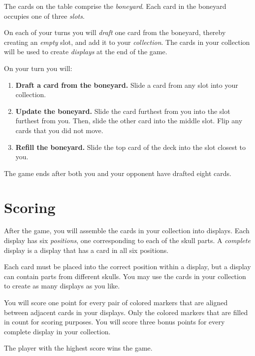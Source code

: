 \documentclass[a6paper, parskip=half, DIV=14, 10pt]{scrartcl}
\begin{document}
The cards on the table comprise the \emph{boneyard}. Each card in the boneyard occupies one of three \emph{slots}.%

On each of your turns you will \emph{draft} one card from the boneyard, thereby creating an \emph{empty} slot, and add it to your \emph{collection}. The cards in your collection will be used to create \emph{displays} at the end of the game.

On your turn you will:
\begin{enumerate}[leftmargin=*]
	\item \textbf{Draft a card from the boneyard.} Slide a card from any slot into your collection.
	\item \textbf{Update the boneyard.} Slide the card furthest from you into the slot furthest from you. Then, slide the other card into the middle slot. Flip any cards that you did not move.
	\item \textbf{Refill the boneyard.} Slide the top card of the deck into the slot closest to you.
\end{enumerate}
The game ends after both you and your opponent have drafted eight cards.

\newpage

\section*{Scoring}
After the game, you will assemble the cards in your collection into displays. Each display has six \emph{positions}, one corresponding to each of the skull parts. A \emph{complete} display is a display that has a card in all six positions.

Each card must be placed into the correct position within a display, but a display can contain parts from different skulls.
You may use the cards in your collection to create as many displays as you like.

You will score one point for every pair of colored markers that are aligned between adjacent cards in your displays. Only the colored markers that are filled in count for scoring purposes. You will score three bonus points for every complete display in your collection.

The player with the highest score wins the game.

\end{document}
